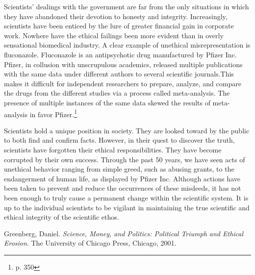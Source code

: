 \documentclass{article}[12pt]
\begin{document}
Scientists' dealings with the government are far from the only situations in
which they have abandoned their devotion to honesty and integrity.
Increasingly, scientists have been enticed by the lure of greater financial
gain in corporate work. Nowhere have the ethical failings been more evident
than in overly sensational biomedical industry. A clear example of unethical
misrepresentation is fluconazole.  Fluconazole is an antipsychotic drug
manufactured by Pfizer Inc.  Pfizer, in collusion with unscrupulous academics,
released multiple publications with the same data under different authors to
several scientific journals.This makes it difficult for independent researchers
to prepare, analyze, and compare the drugs from  the different studies via a
process called meta-analysis. The presence of multiple instances of the same
data skewed the results of meta-analysis in favor Pfizer.\footnote{p. 350}

Scientists hold a unique position in society. They are looked toward by the
public to both find and confirm facts. However, in their quest to discover the
truth, scientists have forgotten their ethical responsibilities.  They have
become corrupted by their own success.  Through the past 50 years, we have seen
acts of unethical behavior ranging from simple greed, such as abusing grants,
to the endangerment of human life, as displayed by Pfizer Inc.  Although
actions have been taken to prevent and reduce the occurrences of these
misdeeds, it has not been enough to truly cause a permanent change within the
scientific system. It is up to the individual scientists to be vigilant in
maintaining the true scientific and ethical integrity of the scientific ethos.

\newpage
\begin{thebibliography}{9}

  Greenberg, Daniel.
  \emph{Science, Money, and Politics: Political Triumph and Ethical Erosion}.
  The University of Chicago Press, Chicago,
  2001.

\end{thebibliography}
\end{document}
